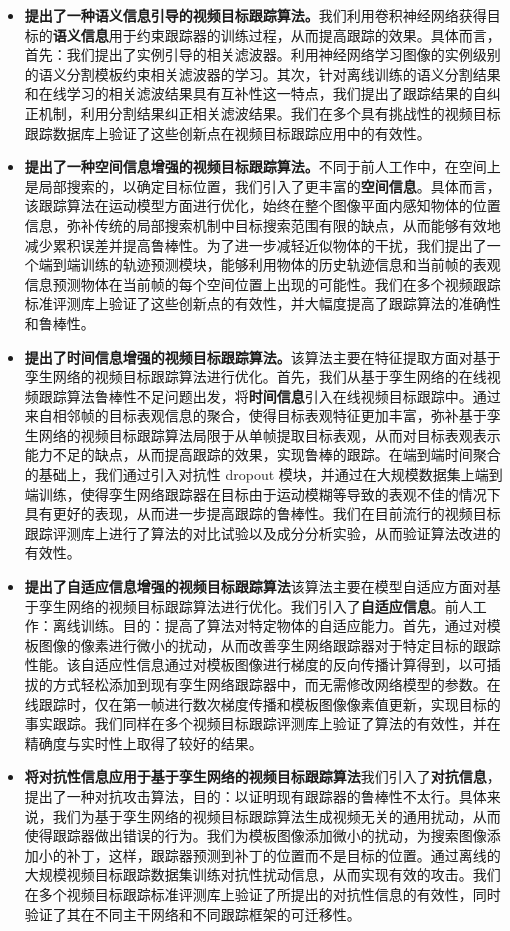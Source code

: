 \begin{itemize}
\item{\textbf{提出了一种语义信息引导的视频目标跟踪算法。}我们利用卷积神经网络获得目标的\textbf{语义信息}用于约束跟踪器的训练过程，从而提高跟踪的效果。具体而言，首先：我们提出了实例引导的相关滤波器。利用神经网络学习图像的实例级别的语义分割模板约束相关滤波器的学习。其次，针对离线训练的语义分割结果和在线学习的相关滤波结果具有互补性这一特点，我们提出了跟踪结果的自纠正机制，利用分割结果纠正相关滤波结果。我们在多个具有挑战性的视频目标跟踪数据库上验证了这些创新点在视频目标跟踪应用中的有效性。}
\item{\textbf{提出了一种空间信息增强的视频目标跟踪算法。}不同于前人工作中，在空间上是局部搜索的，以确定目标位置，我们引入了更丰富的\textbf{空间信息}。具体而言，该跟踪算法在运动模型方面进行优化，始终在整个图像平面内感知物体的位置信息，弥补传统的局部搜索机制中目标搜索范围有限的缺点，从而能够有效地减少累积误差并提高鲁棒性。为了进一步减轻近似物体的干扰，我们提出了一个端到端训练的轨迹预测模块，能够利用物体的历史轨迹信息和当前帧的表观信息预测物体在当前帧的每个空间位置上出现的可能性。我们在多个视频跟踪标准评测库上验证了这些创新点的有效性，并大幅度提高了跟踪算法的准确性和鲁棒性。}
\item{\textbf{提出了时间信息增强的视频目标跟踪算法。}该算法主要在特征提取方面对基于孪生网络的视频目标跟踪算法进行优化。首先，我们从基于孪生网络的在线视频跟踪算法鲁棒性不足问题出发，将\textbf{时间信息}引入在线视频目标跟踪中。通过来自相邻帧的目标表观信息的聚合，使得目标表观特征更加丰富，弥补基于孪生网络的视频目标跟踪算法局限于从单帧提取目标表观，从而对目标表观表示能力不足的缺点，从而提高跟踪的效果，实现鲁棒的跟踪。在端到端时间聚合的基础上，我们通过引入对抗性 dropout 模块，并通过在大规模数据集上端到端训练，使得孪生网络跟踪器在目标由于运动模糊等导致的表观不佳的情况下具有更好的表现，从而进一步提高跟踪的鲁棒性。我们在目前流行的视频目标跟踪评测库上进行了算法的对比试验以及成分分析实验，从而验证算法改进的有效性。}
\item{\textbf{提出了自适应信息增强的视频目标跟踪算法}该算法主要在模型自适应方面对基于孪生网络的视频目标跟踪算法进行优化。我们引入了\textbf{自适应信息}。前人工作：离线训练。目的：提高了算法对特定物体的自适应能力。首先，通过对模板图像的像素进行微小的扰动，从而改善孪生网络跟踪器对于特定目标的跟踪性能。该自适应性信息通过对模板图像进行梯度的反向传播计算得到，以可插拔的方式轻松添加到现有孪生网络跟踪器中，而无需修改网络模型的参数。在线跟踪时，仅在第一帧进行数次梯度传播和模板图像像素值更新，实现目标的事实跟踪。我们同样在多个视频目标跟踪评测库上验证了算法的有效性，并在精确度与实时性上取得了较好的结果。}
\item{\textbf{将对抗性信息应用于基于孪生网络的视频目标跟踪算法}我们引入了\textbf{对抗信息}，提出了一种对抗攻击算法，目的：以证明现有跟踪器的鲁棒性不太行。具体来说，我们为基于孪生网络的视频目标跟踪算法生成视频无关的通用扰动，从而使得跟踪器做出错误的行为。我们为模板图像添加微小的扰动，为搜索图像添加小的补丁，这样，跟踪器预测到补丁的位置而不是目标的位置。通过离线的大规模视频目标跟踪数据集训练对抗性扰动信息，从而实现有效的攻击。我们在多个视频目标跟踪标准评测库上验证了所提出的对抗性信息的有效性，同时验证了其在不同主干网络和不同跟踪框架的可迁移性。}
\end{itemize}

